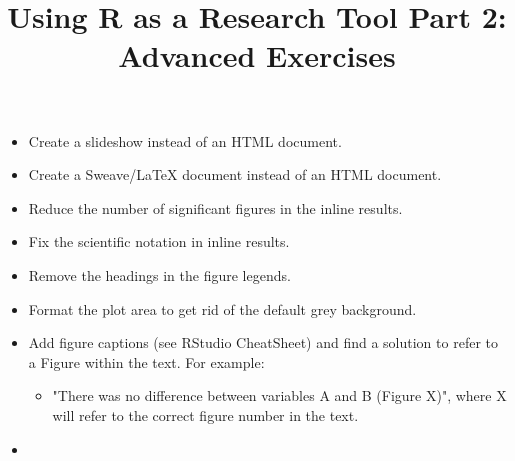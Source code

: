 \documentclass[a4paper,12pt]{article}
\title{Using R as a Research Tool Part 2:\\ Advanced Exercises}
\author{}
\begin{document}
\maketitle

\begin{itemize}

\item Create a slideshow instead of an HTML document.
\item Create a Sweave/LaTeX document instead of an HTML document.
\item Reduce the number of significant figures in the inline results.
\item Fix the scientific notation in inline results.
\item Remove the headings in the figure legends.
\item Format the plot area to get rid of the default grey background.
\item Add figure captions (see RStudio CheatSheet) and find a solution to refer to a Figure within the text. For example:
\begin{itemize}
\item "There was no difference between variables A and B (Figure X)", where X will refer to the correct figure number in the text.
\end{itemize}
\item 





\end{itemize}
\end{document}
